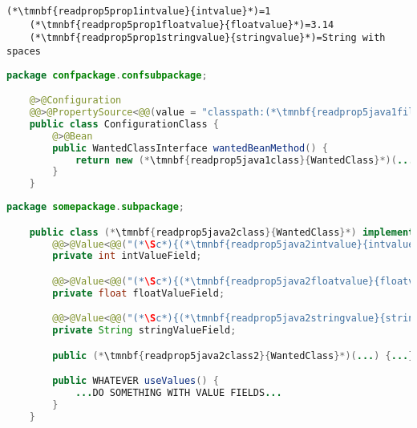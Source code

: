 \begin{lstlisting}[title={A \textit{properties} file called \tmnbf{readprop5prop1filename}{\textit{annotations.properties}}}]
    (*\tmnbf{readprop5prop1intvalue}{intvalue}*)=1
    (*\tmnbf{readprop5prop1floatvalue}{floatvalue}*)=3.14
    (*\tmnbf{readprop5prop1stringvalue}{stringvalue}*)=String with spaces
\end{lstlisting}
\begin{lstlisting}[language=Java, title={Configuration class}]
    package confpackage.confsubpackage;

    @>@Configuration
    @@>@PropertySource<@@(value = "classpath:(*\tmnbf{readprop5java1filename}{annotations.properties}[ForestGreen]*)", encoding = "utf-8")
    public class ConfigurationClass {
        @>@Bean
        public WantedClassInterface wantedBeanMethod() {
            return new (*\tmnbf{readprop5java1class}{WantedClass}*)(...);
        }
    }
\end{lstlisting}
\begin{lstlisting}[language=Java, title={Wanted class with any constructor}]
    package somepackage.subpackage;

    public class (*\tmnbf{readprop5java2class}{WantedClass}*) implements WantedClassInterface {
        @@>@Value<@@("(*\Sc*){(*\tmnbf{readprop5java2intvalue}{intvalue}[ForestGreen]*)}")
        private int intValueField;

        @@>@Value<@@("(*\Sc*){(*\tmnbf{readprop5java2floatvalue}{floatvalue}[ForestGreen]*)}")
        private float floatValueField;

        @@>@Value<@@("(*\Sc*){(*\tmnbf{readprop5java2stringvalue}{stringvalue}[ForestGreen]*)}")
        private String stringValueField;

        public (*\tmnbf{readprop5java2class2}{WantedClass}*)(...) {...}

        public WHATEVER useValues() {
            ...DO SOMETHING WITH VALUE FIELDS...
        }
    }
\end{lstlisting}
\newpage
